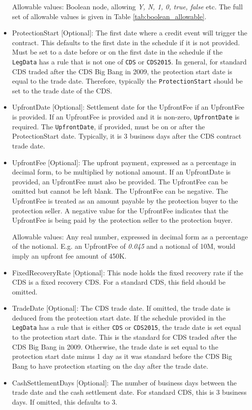 \begin{itemize}
Allowable values: Boolean node, allowing \emph{Y, N, 1, 0, true, false} etc. The full set of allowable values is given in Table \ref{tab:boolean_allowable}.
  
\item ProtectionStart [Optional]: The first date where a credit event will trigger the contract. This defaults to the first date in the schedule if it is not provided. Must be set to a date before or on the first date in the schedule if the \lstinline!LegData! has a rule that is not one of \lstinline!CDS! or \lstinline!CDS2015!. In general, for standard CDS traded after the CDS Big Bang in 2009, the protection start date is equal to the trade date. Therefore, typically the \lstinline!ProtectionStart! should be set to the trade date of the CDS.
\item UpfrontDate [Optional]: Settlement date for the UpfrontFee if an UpfrontFee is provided. If an UpfrontFee is provided and it is non-zero, \lstinline!UpfrontDate! is required. The \lstinline!UpfrontDate!, if provided, must be on or after the ProtectionStart date. Typically, it is 3 business days after the CDS contract trade date.
\item UpfrontFee [Optional]: The upfront payment, expressed as a percentage in decimal form, to be multiplied by notional amount.  If an UpfrontDate is provided, an UpfrontFee must also be provided. The UpfrontFee can be omitted but cannot be left blank.
The UpfrontFee can be negative. The UpfrontFee is treated as an amount payable by the protection buyer to the protection seller. A negative value for the UpfrontFee indicates that the UpfrontFee is being paid by the protection seller to the protection buyer.

Allowable values: Any real number, expressed in decimal form as a percentage of the notional.  E.g. an UpfrontFee of \emph{0.045} and a notional of 10M, would imply an upfront fee amount of 450K.

\item FixedRecoveryRate [Optional]: This node holds the fixed recovery rate if the CDS is a fixed recovery CDS. For a standard CDS, this field should be omitted.
\item TradeDate [Optional]: The CDS trade date. If omitted, the trade date is deduced from the protection start date. If the schedule provided in the \lstinline!LegData! has a rule that is either \lstinline!CDS! or \lstinline!CDS2015!, the trade date is set equal to the protection start date. This is the standard for CDS traded after the CDS Big Bang in 2009. Otherwise, the trade date is set equal to the protection start date minus 1 day as it was standard before the CDS Big Bang to have protection starting on the day after the trade date.
\item CashSettlementDays [Optional]: The number of business days between the trade date and the cash settlement date. For standard CDS, this is 3 business days. If omitted, this defaults to 3.
\end{itemize}

